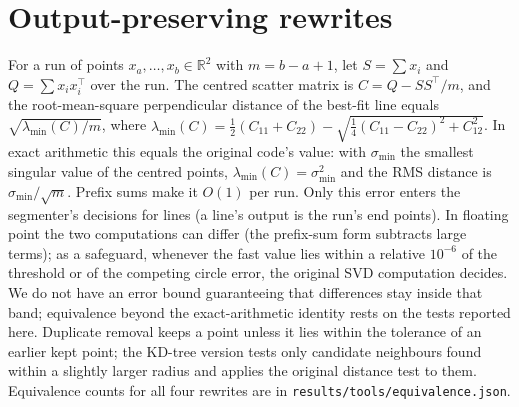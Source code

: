 \section{Output-preserving rewrites}
\label{app:rewrites}
For a run of points $x_a,\dots,x_b\in\mathbb{R}^2$ with $m=b-a+1$, let $S=\sum x_i$ and $Q=\sum x_i x_i^{\top}$ over the run. The centred scatter matrix is $C=Q-SS^{\top}/m$, and the root-mean-square perpendicular distance of the best-fit line equals $\sqrt{\lambda_{\min}(C)/m}$, where $\lambda_{\min}(C)=\tfrac12(C_{11}+C_{22})-\sqrt{\tfrac14(C_{11}-C_{22})^2+C_{12}^2}$. In exact arithmetic this equals the original code's value: with $\sigma_{\min}$ the smallest singular value of the centred points, $\lambda_{\min}(C)=\sigma_{\min}^2$ and the RMS distance is $\sigma_{\min}/\sqrt{m}$. Prefix sums make it $O(1)$ per run. Only this error enters the segmenter's decisions for lines (a line's output is the run's end points). In floating point the two computations can differ (the prefix-sum form subtracts large terms); as a safeguard, whenever the fast value lies within a relative $10^{-6}$ of the threshold or of the competing circle error, the original SVD computation decides. We do not have an error bound guaranteeing that differences stay inside that band; equivalence beyond the exact-arithmetic identity rests on the tests reported here. Duplicate removal keeps a point unless it lies within the tolerance of an earlier kept point; the KD-tree version tests only candidate neighbours found within a slightly larger radius and applies the original distance test to them. Equivalence counts for all four rewrites are in \texttt{results/tools/equivalence.json}.


